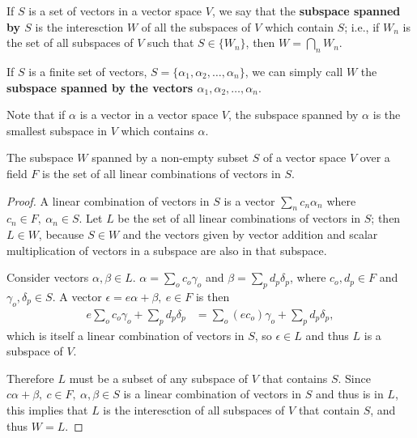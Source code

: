 \documentclass[12pt]{article}
\begin{document}
\begin{defn}
  If $S$ is a set of vectors in a vector space $V$, we say that the \textbf{subspace
  spanned by $S$} is the interesction $W$ of all the subspaces of $V$ which contain
  $S$; i.e., if ${W_n}$ is the set of all subspaces of $V$ such that $S \in \{W_n\}$,
  then $W = \bigcap_{n}W_n$.

  If $S$ is a finite set of vectors, $S = \{\alpha_1,\alpha_2,\ldots,\alpha_n\}$, we
  can simply call $W$ the \textbf{subspace spanned by the vectors
  $\alpha_1,\alpha_2,\ldots,\alpha_n$}.
\end{defn}

\begin{comm}
  Note that if $\alpha$ is a vector in a vector space $V$, the subspace spanned by
  $\alpha$ is the smallest subspace in $V$ which contains $\alpha$.
\end{comm}

\begin{thm}
  The subspace $W$ spanned by a non-empty subset $S$ of a vector space $V$ over a
  field $F$ is the set of all linear combinations of vectors in $S$.

  \begin{proof}
    A linear combination of vectors in $S$ is a vector $\sum_{n}c_n\alpha_n$ where
    $c_n \in F,\ \alpha_n \in S$. Let $L$ be the set of all linear combinations of
    vectors in $S$; then $L \in W$, because $S \in W$ and the vectors given by vector
    addition and scalar multiplication of vectors in a subspace are also in that
    subspace.

    Consider vectors $\alpha,\beta \in L$. $\alpha = \sum_{o}c_o\gamma_o$ and $\beta
    = \sum_{p}d_p\delta_p$, where $c_o,d_p \in F$ and $\gamma_o,\delta_p \in S$. A
    vector $\epsilon = e\alpha + \beta,\ e \in F$ is then
    \begin{align*}
      e\sum_{o}c_o\gamma_o + \sum_{p}d_p\delta_p &=
      \sum_{o}(ec_o)\gamma_o + \sum_{p}d_p\delta_p,
    \end{align*}
    which is itself a linear combination of vectors in $S$, so $\epsilon \in L$ and
    thus $L$ is a subspace of $V$.

    Therefore $L$ must be a subset of any subspace of $V$ that contains $S$. Since
    $c\alpha + \beta,\ c \in F,\ \alpha,\beta \in S$ is a linear combination of
    vectors in $S$ and thus is in $L$, this implies that $L$ is the interesction of
    all subspaces of $V$ that contain $S$, and thus $W = L$.
  \end{proof}
\end{thm}
\end{document}
